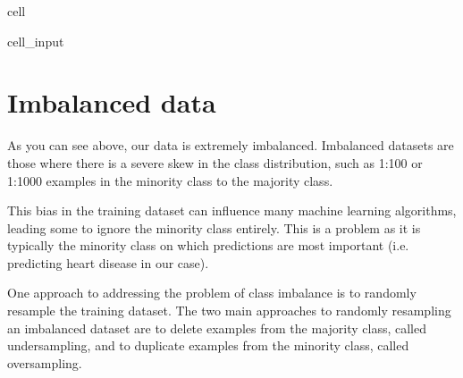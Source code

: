 \documentclass[letterpaper,10pt,english]{jupyterBook}
\begin{document}
\begin{sphinxuseclass}{cell}
\begin{sphinxVerbatimInput}
\begin{sphinxuseclass}{cell_input}
\begin{sphinxVerbatim}[commandchars=\\\{\}]
        \PYG{p}{[}       \PYG{p}{]}
        \PYG{p}{[}\PYG{p}{]}
    
     
\end{sphinxVerbatim}

\end{sphinxuseclass}\end{sphinxVerbatimInput}

\end{sphinxuseclass}

\section{Imbalanced data}
\label{\detokenize{Model_evaluation:imbalanced-data}}
\sphinxAtStartPar
As you can see above, our data is extremely imbalanced. Imbalanced datasets are those where there is a severe skew in the class distribution, such as 1:100 or 1:1000 examples in the minority class to the majority class.

\sphinxAtStartPar
This bias in the training dataset can influence many machine learning algorithms, leading some to ignore the minority class entirely. This is a problem as it is typically the minority class on which predictions are most important (i.e. predicting heart disease in our case).

\sphinxAtStartPar
One approach to addressing the problem of class imbalance is to randomly resample the training dataset. The two main approaches to randomly resampling an imbalanced dataset are to delete examples from the majority class, called undersampling, and to duplicate examples from the minority class, called oversampling.
\end{document}
